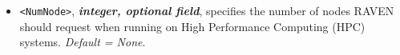 \begin{itemize}

\item \texttt{<NumNode>}, \textbf{\textit{integer, optional field}}, specifies
the number of nodes RAVEN should request when running on High Performance
Computing (HPC) systems.
%
\textit{Default = None}.


\end{itemize}
